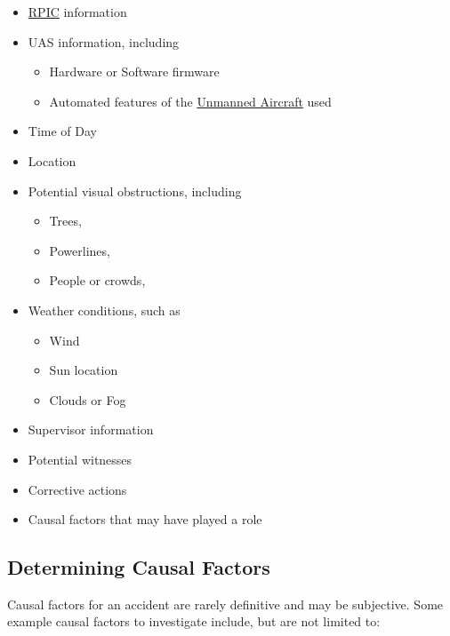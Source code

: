 \documentclass[
]{book}
\providecommand{\tightlist}{%
  \setlength{\itemsep}{0pt}\setlength{\parskip}{0pt}}
\begin{document}
\begin{itemize}
\item
  \protect\hyperlink{RPIC}{RPIC} information
\item
  UAS information, including

  \begin{itemize}
  \tightlist
  \item
    Hardware or Software firmware
  \item
    Automated features of the \protect\hyperlink{UA}{Unmanned Aircraft} used
  \end{itemize}
\item
  Time of Day
\item
  Location
\item
  Potential visual obstructions, including

  \begin{itemize}
  \tightlist
  \item
    Trees,
  \item
    Powerlines,
  \item
    People or crowds,
  \end{itemize}
\item
  Weather conditions, such as

  \begin{itemize}
  \tightlist
  \item
    Wind
  \item
    Sun location
  \item
    Clouds or Fog
  \end{itemize}
\item
  Supervisor information
\item
  Potential witnesses
\item
  Corrective actions
\item
  Causal factors that may have played a role
\end{itemize}

\hypertarget{determining-causal-factors}{%
\subsection{Determining Causal Factors}\label{determining-causal-factors}}

Causal factors for an accident are rarely definitive and may be subjective. Some example causal factors to investigate include, but are not limited to:
\end{document}
